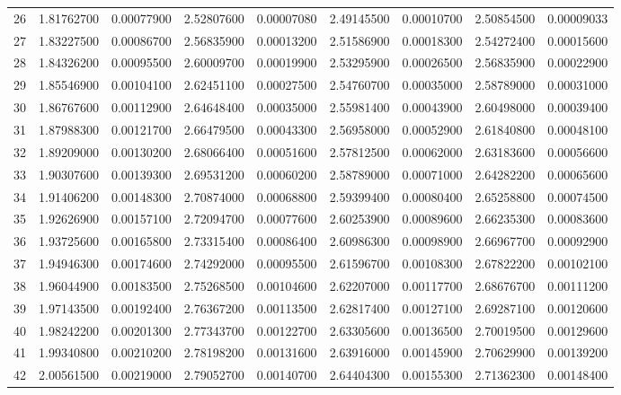 \begin{table}[h]
{\begin{tabular}{ccccccccc}
26     & 1.81762700 & 0.00077900  & 2.52807600 & 0.00007080  & 2.49145500 & 0.00010700 & 2.50854500 & 0.00009033  \\
27     & 1.83227500 & 0.00086700  & 2.56835900 & 0.00013200  & 2.51586900 & 0.00018300 & 2.54272400 & 0.00015600  \\
28     & 1.84326200 & 0.00095500  & 2.60009700 & 0.00019900  & 2.53295900 & 0.00026500 & 2.56835900 & 0.00022900  \\
29     & 1.85546900 & 0.00104100  & 2.62451100 & 0.00027500  & 2.54760700 & 0.00035000 & 2.58789000 & 0.00031000  \\
30     & 1.86767600 & 0.00112900  & 2.64648400 & 0.00035000  & 2.55981400 & 0.00043900 & 2.60498000 & 0.00039400  \\
31     & 1.87988300 & 0.00121700  & 2.66479500 & 0.00043300  & 2.56958000 & 0.00052900 & 2.61840800 & 0.00048100  \\
32     & 1.89209000 & 0.00130200  & 2.68066400 & 0.00051600  & 2.57812500 & 0.00062000 & 2.63183600 & 0.00056600  \\
33     & 1.90307600 & 0.00139300  & 2.69531200 & 0.00060200  & 2.58789000 & 0.00071000 & 2.64282200 & 0.00065600  \\
34     & 1.91406200 & 0.00148300  & 2.70874000 & 0.00068800  & 2.59399400 & 0.00080400 & 2.65258800 & 0.00074500  \\
35     & 1.92626900 & 0.00157100  & 2.72094700 & 0.00077600  & 2.60253900 & 0.00089600 & 2.66235300 & 0.00083600  \\
36     & 1.93725600 & 0.00165800  & 2.73315400 & 0.00086400  & 2.60986300 & 0.00098900 & 2.66967700 & 0.00092900  \\
37     & 1.94946300 & 0.00174600  & 2.74292000 & 0.00095500  & 2.61596700 & 0.00108300 & 2.67822200 & 0.00102100  \\
38     & 1.96044900 & 0.00183500  & 2.75268500 & 0.00104600  & 2.62207000 & 0.00117700 & 2.68676700 & 0.00111200  \\
39     & 1.97143500 & 0.00192400  & 2.76367200 & 0.00113500  & 2.62817400 & 0.00127100 & 2.69287100 & 0.00120600  \\
40     & 1.98242200 & 0.00201300  & 2.77343700 & 0.00122700  & 2.63305600 & 0.00136500 & 2.70019500 & 0.00129600  \\
41     & 1.99340800 & 0.00210200  & 2.78198200 & 0.00131600  & 2.63916000 & 0.00145900 & 2.70629900 & 0.00139200  \\
42     & 2.00561500 & 0.00219000  & 2.79052700 & 0.00140700  & 2.64404300 & 0.00155300 & 2.71362300 & 0.00148400  \\

\end{tabular}}
\end{table}
